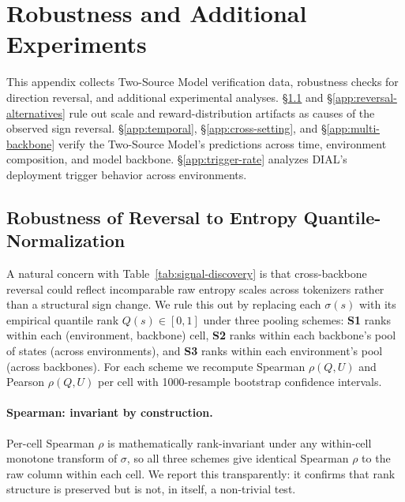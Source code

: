 \section{Robustness and Additional Experiments}
\label{app:robustness}

This appendix collects Two-Source Model verification data,
robustness checks for direction reversal, and additional
experimental analyses.
\S\ref{app:reversal-norm} and \S\ref{app:reversal-alternatives}
rule out scale and reward-distribution artifacts as causes of the
observed sign reversal.
\S\ref{app:temporal}, \S\ref{app:cross-setting}, and
\S\ref{app:multi-backbone} verify the Two-Source Model's
predictions across time, environment composition, and model
backbone.
\S\ref{app:trigger-rate} analyzes DIAL's deployment trigger
behavior across environments.

\subsection{Robustness of Reversal to Entropy Quantile-Normalization}
\label{app:reversal-norm}

A natural concern with Table~\ref{tab:signal-discovery} is that
cross-backbone reversal could reflect incomparable raw entropy
scales across tokenizers rather than a structural sign change.
We rule this out by replacing each $\sigma(s)$ with its empirical
quantile rank $Q(s) \!\in\! [0, 1]$ under three pooling schemes:
\textbf{S1} ranks within each (environment, backbone) cell,
\textbf{S2} ranks within each backbone's pool of states (across
environments), and \textbf{S3} ranks within each environment's
pool (across backbones). For each scheme we recompute Spearman
$\rho(Q, U)$ and Pearson $\rho(Q, U)$ per cell with 1000-resample
bootstrap confidence intervals.

\paragraph{Spearman: invariant by construction.} Per-cell
Spearman $\rho$ is mathematically rank-invariant under any
within-cell monotone transform of $\sigma$, so all three schemes
give identical Spearman $\rho$ to the raw column within each
cell. We report this transparently: it confirms that rank
structure is preserved but is not, in itself, a non-trivial test.


